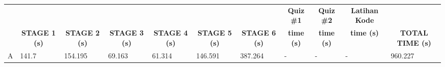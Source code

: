 \begin{landscape}
\begin{longtable}[c]{|l|llllllllll|}
  \rowcolor[HTML]{C0C0C0} 
  \multicolumn{1}{|c|}{\cellcolor[HTML]{C0C0C0}}                                  & \multicolumn{1}{c|}{\cellcolor[HTML]{C0C0C0}}                                       & \multicolumn{1}{c|}{\cellcolor[HTML]{C0C0C0}}                                       & \multicolumn{1}{c|}{\cellcolor[HTML]{C0C0C0}}                                       & \multicolumn{1}{c|}{\cellcolor[HTML]{C0C0C0}}                                       & \multicolumn{1}{c|}{\cellcolor[HTML]{C0C0C0}}                                       & \multicolumn{1}{c|}{\cellcolor[HTML]{C0C0C0}}                                       & \multicolumn{1}{c|}{\cellcolor[HTML]{C0C0C0}\textbf{Quiz \#1}} & \multicolumn{1}{c|}{\cellcolor[HTML]{C0C0C0}\textbf{Quiz \#2}} & \multicolumn{1}{c|}{\cellcolor[HTML]{C0C0C0}\textbf{Latihan Kode}} & \multicolumn{1}{c|}{\cellcolor[HTML]{C0C0C0}}                                          \\ \cline{8-10}
  \rowcolor[HTML]{C0C0C0} 
  \multicolumn{1}{|c|}{\multirow{-4}{*}{\cellcolor[HTML]{C0C0C0}\textbf{SUBJEK}}} & \multicolumn{1}{c|}{\multirow{-2}{*}{\cellcolor[HTML]{C0C0C0}\textbf{STAGE 1 (s)}}} & \multicolumn{1}{c|}{\multirow{-2}{*}{\cellcolor[HTML]{C0C0C0}\textbf{STAGE 2 (s)}}} & \multicolumn{1}{c|}{\multirow{-2}{*}{\cellcolor[HTML]{C0C0C0}\textbf{STAGE 3 (s)}}} & \multicolumn{1}{c|}{\multirow{-2}{*}{\cellcolor[HTML]{C0C0C0}\textbf{STAGE 4 (s)}}} & \multicolumn{1}{c|}{\multirow{-2}{*}{\cellcolor[HTML]{C0C0C0}\textbf{STAGE 5 (s)}}} & \multicolumn{1}{c|}{\multirow{-2}{*}{\cellcolor[HTML]{C0C0C0}\textbf{STAGE 6 (s)}}} & \multicolumn{1}{c|}{\cellcolor[HTML]{C0C0C0}\textbf{time (s)}} & \multicolumn{1}{c|}{\cellcolor[HTML]{C0C0C0}\textbf{time (s)}} & \multicolumn{1}{c|}{\cellcolor[HTML]{C0C0C0}\textbf{time (s)}}     & \multicolumn{1}{c|}{\multirow{-3}{*}{\cellcolor[HTML]{C0C0C0}\textbf{TOTAL TIME (s)}}} \\ \hline
  \endhead
  A                                                                               & \multicolumn{1}{l|}{141.7}                                                          & \multicolumn{1}{l|}{154.195}                                                        & \multicolumn{1}{l|}{69.163}                                                         & \multicolumn{1}{l|}{61.314}                                                         & \multicolumn{1}{l|}{146.591}                                                        & \multicolumn{1}{l|}{387.264}                                                        & \multicolumn{1}{l|}{-}                                         & \multicolumn{1}{l|}{-}                                         & \multicolumn{1}{l|}{-}                                             & 960.227                                                                                \\ \hline

\end{longtable}
\end{landscape}
